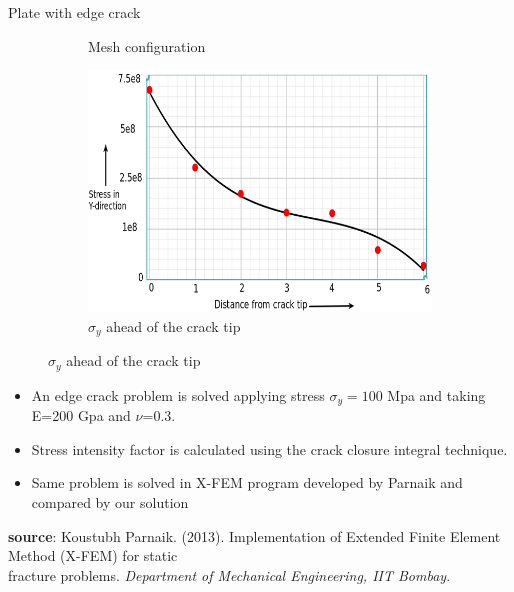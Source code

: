 \documentclass{beamer}
\begin{document}
\begin{frame}[t,fragile]{Plate with edge crack}
\begin{figure}
\begin{subfigure}{.2\textwidth}
            \caption{\scriptsize Mesh configuration}
    \end{subfigure}
    \begin{subfigure}{.5\textwidth}
    \vspace{10pt}
         \includegraphics[scale=.25]{z}
        \vspace{-5pt}
         \caption{\scriptsize $\sigma_y$ ahead of the crack tip}
    \end{subfigure}
\end{figure}
    \vspace{-10pt}
\begin{itemize}
        \scriptsize
     \item An edge crack problem is solved applying stress $\sigma_y=100$ Mpa and taking E=200 Gpa and $\nu$=0.3.
     \item Stress intensity factor is calculated using the crack closure integral technique. 
     \item Same problem is solved in X-FEM program developed by Parnaik and compared by our solution 
\end{itemize}
\tiny
   \hspace{15pt}
    \textbf{source}:  Koustubh Parnaik. (2013). Implementation of Extended Finite Element Method (X-FEM) for static\\
   \hspace{15pt}fracture problems.
\emph{Department of Mechanical Engineering, IIT Bombay}.

\end{frame}
\end{document}

